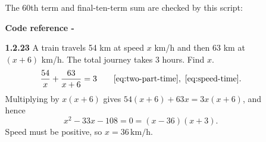 \begin{enumerate}[label={},leftmargin=0pt]
\begin{enumerate}[label={},leftmargin=4mm,itemsep=9pt]
The 60th term and final-ten-term sum are checked by this script:
\par\smallskip
\noindent\textbf{Code reference -}
\par\noindent{}
\par\smallskip
\setcounter{enumii}{23}
\setcounter{equation}{0}
\item[\textbf{1.2.23}] A train travels 54 km at speed $x$ km/h and then 63 km at $(x+6)$ km/h. The total journey takes 3 hours. Find $x$.
\solution
\begin{equation*}
\frac{54}{x}+\frac{63}{x+6}=3\qquad\eqref{eq:two-part-time},\ \eqref{eq:speed-time}.
\end{equation*}
Multiplying by $x(x+6)$ gives $54(x+6)+63x=3x(x+6)$, and hence
\begin{equation*}
x^2-33x-108=0=(x-36)(x+3).
\end{equation*}
Speed must be positive, so $x=36\,\mathrm{km/h}$.





\end{enumerate}
\end{enumerate}
